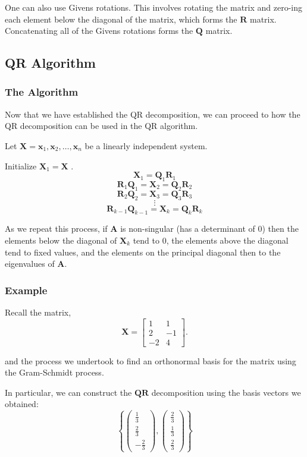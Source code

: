 \documentclass[onecolumn]{webofc}
\begin{document}
One can also use Givens rotations. This involves rotating the matrix and zero-ing each element below the diagonal of the matrix, which forms the $\mathbf{R}$ matrix. Concatenating all of the Givens rotations forms the $\mathbf{Q}$ matrix\cite{RefD}.


\subsection{QR Algorithm}
\subsubsection*{The Algorithm}
Now that we have established the QR decomposition, we can proceed to how the QR decomposition can be used in the QR algorithm. 

Let $\mathbf{X} = \mathbf{x}_1, \mathbf{x}_2, \ldots, \mathbf{x}_n$ be a linearly independent system.

Initialize $\mathbf{X}_1 = \mathbf{X}$ .
$$\mathbf{X}_1 = \mathbf{Q}_1\mathbf{R}_1$$
$$\mathbf{R}_1\mathbf{Q}_1 = \mathbf{X}_2 = \mathbf{Q}_2\mathbf{R}_2$$
$$\mathbf{R}_2\mathbf{Q}_2 = \mathbf{X}_3 = \mathbf{Q}_3\mathbf{R}_3$$
$$\vdots$$
$$\mathbf{R}_{k-1}\mathbf{Q}_{k-1} = \mathbf{X}_k = \mathbf{Q}_k\mathbf{R}_k$$

As we repeat this process, if $\mathbf{A}$ is non-singular (has a determinant of 0) then the elements below the diagonal of $\mathbf{X}_k$ tend to $0$, the elements above the diagonal tend to fixed values, and the elements on the principal diagonal then to the eigenvalues of $\mathbf{A}$.

\subsubsection*{Example}
Recall the matrix,
$$\mathbf{X} =  \begin{bmatrix}
1 & 1 \\
2 & -1 \\
-2 & 4 
\end{bmatrix}. $$

and the process we undertook to find an orthonormal basis for the matrix using the Gram-Schmidt process.

In particular, we can construct the $\mathbf{QR}$ decomposition using the basis vectors we obtained:
$$\left\{
\begin{pmatrix} \frac{1}{3} \\ \frac{2}{3} \\ -\frac{2}{3} \end{pmatrix},
\begin{pmatrix} \frac{2}{3} \\ \frac{1}{3} \\ \frac{2}{3}\end{pmatrix}
\right\}$$
\end{document}
